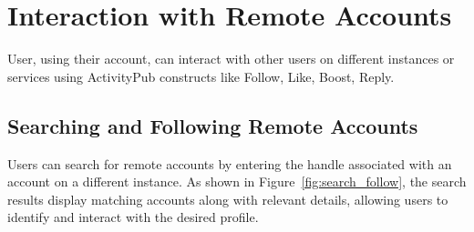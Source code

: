 \clearpage

\section{Interaction with Remote Accounts}
User, using their account, can interact with other users on different instances or services using ActivityPub\cite{ActivityPub} constructs like Follow, Like, Boost, Reply. 

\subsection{Searching and Following Remote Accounts}
Users can search for remote accounts by entering the handle associated with an account on a different instance. As shown in Figure~\ref{fig:search_follow}, the search results display matching accounts along with relevant details, allowing users to identify and interact with the desired profile.

